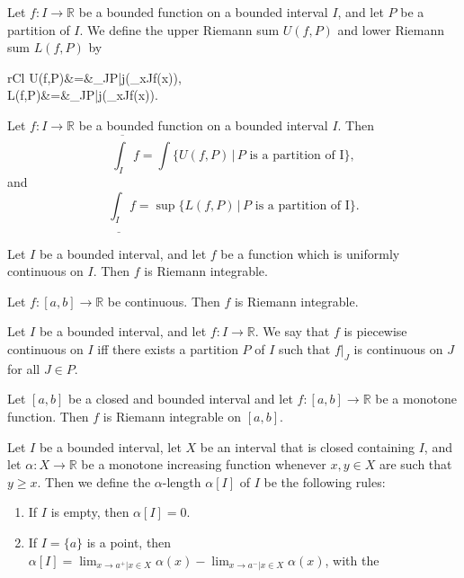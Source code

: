\documentclass{article}
\begin{document}
\begin{definition}
	Let \(f:I\rightarrow\mathbb{R}\) be a bounded function on a bounded interval \(I\), and let \(P\) be a partition of \(I\). We define the upper Riemann sum \(U(f,P)\) and lower Riemann sum \(L(f,P)\) by
	\begin{IEEEeqnarray*}{rCl}
		U(f,P)&=&\sum_{J\in P|j\neq\emptyset}\big(\sup_{x\in J}f(x)\big),\\
		L(f,P)&=&\sum_{J\in P|j\neq\emptyset}\big(\inf_{x\in J}f(x)\big).
	\end{IEEEeqnarray*}
\end{definition}
\begin{proposition}
	Let \(f:I\rightarrow\mathbb{R}\) be a bounded function on a bounded interval \(I\). Then
	\begin{equation*}
		\overline{\int_I}f=\int\{U(f,P)\,|\,P\text{ is a partition of I}\},
	\end{equation*}
	and
	\begin{equation*}
		\underline{\int_I}f=\sup\{L(f,P)\,|\,P\text{ is a partition of I}\}.
	\end{equation*}
\end{proposition}
\begin{theorem}
	Let \(I\) be a bounded interval, and let \(f\) be a function which is uniformly continuous on \(I\). Then \(f\) is Riemann integrable.
\end{theorem}
\begin{corollary}
	Let \(f:[a,b]\rightarrow\mathbb{R}\) be continuous. Then \(f\) is Riemann integrable.
\end{corollary}
\begin{definition}
	Let \(I\) be a bounded interval, and let \(f:I\rightarrow\mathbb{R}\). We say that \(f\) is piecewise continuous on \(I\) iff there exists a partition \(P\) of \(I\) such that \(f|_J\) is continuous on \(J\) for all \(J\in P\).
\end{definition}
\begin{proposition}
	Let \([a,b]\) be a closed and bounded interval and let \(f:[a,b]\rightarrow\mathbb{R}\) be a monotone function. Then \(f\) is Riemann integrable on \([a,b]\).
\end{proposition}
\begin{definition}
	Let \(I\) be a bounded interval, let \(X\) be an interval that is closed containing \(I\), and let \(\alpha:X\rightarrow\mathbb{R}\) be a monotone increasing function whenever \(x,y\in X\) are such that \(y\geq x\). Then we define the \(\alpha\)-length \(\alpha[I]\) of \(I\) be the following rules:
	\begin{enumerate}
		\item If \(I\) is empty, then \(\alpha[I]=0\).
		\item If \(I=\{a\}\) is a point, then \(\alpha[I]=\lim_{x\rightarrow a^+|x\in X}\alpha(x)-\lim_{x\rightarrow a^-|x\in X}\alpha(x)\), with the 
	\end{enumerate}
\end{definition}
\end{document}
